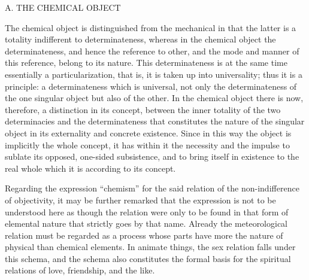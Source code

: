 A. THE CHEMICAL OBJECT

The chemical object is distinguished from
the mechanical in that the latter is
a totality indifferent to determinateness,
whereas in the chemical object the determinateness,
and hence the reference to other,
and the mode and manner of this reference,
belong to its nature.
This determinateness is at the same time
essentially a particularization,
that is, it is taken up into universality;
thus it is a principle:
a determinateness which is universal,
not only the determinateness
of the one singular object
but also of the other.
In the chemical object there is now, therefore,
a distinction in its concept,
between the inner totality of the two determinacies
and the determinateness that constitutes
the nature of the singular object
in its externality and concrete existence.
Since in this way the object is implicitly the whole concept,
it has within it the necessity and the impulse
to sublate its opposed, one-sided subsistence,
and to bring itself in existence to the real whole
which it is according to its concept.

Regarding the expression “chemism” for the said
relation of the non-indifference of objectivity,
it may be further remarked that the expression is
not to be understood here as though the relation were
only to be found in that form of elemental nature
that strictly goes by that name.
Already the meteorological relation must be regarded
as a process whose parts have more the nature
of physical than chemical elements.
In animate things, the sex relation falls under this schema,
and the schema also constitutes the formal basis
for the spiritual relations of love, friendship, and the like.

